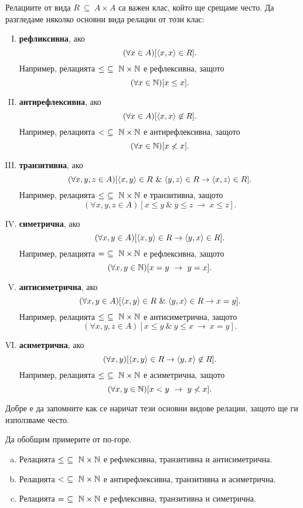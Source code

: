 Релациите от вида $R\ \subseteq\ A\times A$ са важен клас, който ще срещаме често.
Да разгледаме няколко основни вида релации от този клас:
\begin{enumerate}[I)]
\item
  {\bf рефликсивна}, ако
  \[(\forall x\in A)[\langle{x,x}\rangle\in R].\]
  Например, релацията $\leq\ \subseteq\ \Nat\times\Nat$ е рефлексивна, защото
  \[(\forall x\in \mathbb{N})[x \leq x].\]
\item
  {\bf антирефлексивна}, ако
  \[(\forall x\in A)[\langle{x,x}\rangle\not\in R].\]
  Например, релацията $<\ \subseteq\ \Nat\times\Nat$ е антирефлексивна, защото
  \[(\forall x\in \mathbb{N})[x \not< x].\]
\item
  {\bf транзитивна}, ако
  \[(\forall x,y,z\in A)[\pair{x,y}\in R\ \&\ \pair{y,z}\in R \rightarrow \pair{x,z}\in R].\]
  Например, релацията $\leq\ \subseteq\ \Nat\times\Nat$ е транзитивна, защото
  \[(\forall x,y,z\in A)[x \leq y\ \&\ y \leq z\ \rightarrow\ x\leq z].\]
\item
  {\bf симетрична}, ако
  \[(\forall x,y\in A)[\langle{x,y}\rangle\in R \rightarrow \langle{y,x}\rangle\in R].\]
  Например, релацията $=\ \subseteq\ \Nat\times\Nat$ е рефлексивна, защото
  \[(\forall x,y\in \Nat)[x = y\ \rightarrow\ y = x].\]
\item
  {\bf антисиметрична}, ако
  \[(\forall x,y\in A)[\pair{x,y}\in R\ \&\ \pair{y,x}\in R \rightarrow x = y].\]
  Например, релацията $\leq\ \subseteq\ \Nat\times\Nat$ е антисиметрична, защото
  \[(\forall x,y,z\in A)[x \leq y\ \&\ y \leq x\ \rightarrow\ x = y].\]
\item
  {\bf асиметрична}, ако
  \[(\forall x,y)[\langle{x,y}\rangle\in R \rightarrow \langle{y,x}\rangle\not\in R].\]
  Например, релацията $\leq\ \subseteq\ \Nat\times\Nat$ е асиметрична, защото
  \[(\forall x,y\in \mathbb{N})[x < y\ \rightarrow\ y \not< x].\]
\end{enumerate}

\begin{remark}
  Добре е да запомните как се наричат тези основни видове релации,
  защото ще ги използваме често.
\end{remark}

\begin{example}
  Да обобщим примерите от по-горе.
  \begin{enumerate}[a)]
  \item
    Релацията $\leq\ \subseteq\ \Nat\times\Nat$ е рефлексивна, транзитивна и антисиметрична.
  \item
    Релацията $<\ \subseteq\ \Nat\times\Nat$ е антирефлексивна, транзитивна и асиметрична.
  \item
    Релацията $=\ \subseteq\ \Nat\times\Nat$ е рефлексивна, транзитивна и симетрична.
  \end{enumerate}
\end{example}


